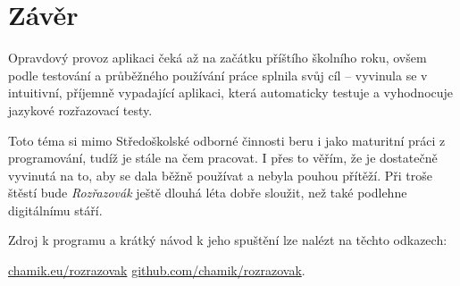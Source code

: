 \chapter*{Závěr}

Opravdový provoz aplikaci čeká až na začátku příštího školního roku, ovšem podle testování a průběžného používání práce splnila svůj cíl -- vyvinula se v intuitivní, příjemně vypadající aplikaci, která automaticky testuje a vyhodnocuje jazykové rozřazovací testy. 

Toto téma si mimo Středoškolské odborné činnosti beru i jako maturitní práci z programování, tudíž je stále na čem pracovat. I přes to věřím, že je dostatečně vyvinutá na to, aby se dala běžně používat a nebyla pouhou přítěží. Při troše štěstí bude \textit{Rozřazovák} ještě dlouhá léta dobře sloužit, než také podlehne digitálnímu stáří.

Zdroj k programu a krátký návod k jeho spuštění lze nalézt na těchto odkazech:

\href{https://chamik.eu/rozrazovak}{chamik.eu/rozrazovak} \newline
\href{https://github.com/chamik/rozrazovak/}{github.com/chamik/rozrazovak}.